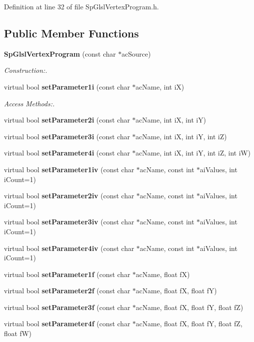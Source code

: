 Definition at line 32 of file Sp\-Glsl\-Vertex\-Program.h.\subsection*{Public Member Functions}
\begin{CompactItemize}
\item 
{\bf Sp\-Glsl\-Vertex\-Program} (const char $\ast$ac\-Source)
\begin{CompactList}\small\item\em Construction:. \item\end{CompactList}\item 
virtual bool {\bf set\-Parameter1i} (const char $\ast$ac\-Name, int i\-X)
\begin{CompactList}\small\item\em Access Methods:. \item\end{CompactList}\item 
virtual bool {\bf set\-Parameter2i} (const char $\ast$ac\-Name, int i\-X, int i\-Y)
\item 
virtual bool {\bf set\-Parameter3i} (const char $\ast$ac\-Name, int i\-X, int i\-Y, int i\-Z)
\item 
virtual bool {\bf set\-Parameter4i} (const char $\ast$ac\-Name, int i\-X, int i\-Y, int i\-Z, int i\-W)
\item 
virtual bool {\bf set\-Parameter1iv} (const char $\ast$ac\-Name, const int $\ast$ai\-Values, int i\-Count=1)
\item 
virtual bool {\bf set\-Parameter2iv} (const char $\ast$ac\-Name, const int $\ast$ai\-Values, int i\-Count=1)
\item 
virtual bool {\bf set\-Parameter3iv} (const char $\ast$ac\-Name, const int $\ast$ai\-Values, int i\-Count=1)
\item 
virtual bool {\bf set\-Parameter4iv} (const char $\ast$ac\-Name, const int $\ast$ai\-Values, int i\-Count=1)
\item 
virtual bool {\bf set\-Parameter1f} (const char $\ast$ac\-Name, float f\-X)
\item 
virtual bool {\bf set\-Parameter2f} (const char $\ast$ac\-Name, float f\-X, float f\-Y)
\item 
virtual bool {\bf set\-Parameter3f} (const char $\ast$ac\-Name, float f\-X, float f\-Y, float f\-Z)
\item 
virtual bool {\bf set\-Parameter4f} (const char $\ast$ac\-Name, float f\-X, float f\-Y, float f\-Z, float f\-W)

\end{CompactItemize}
